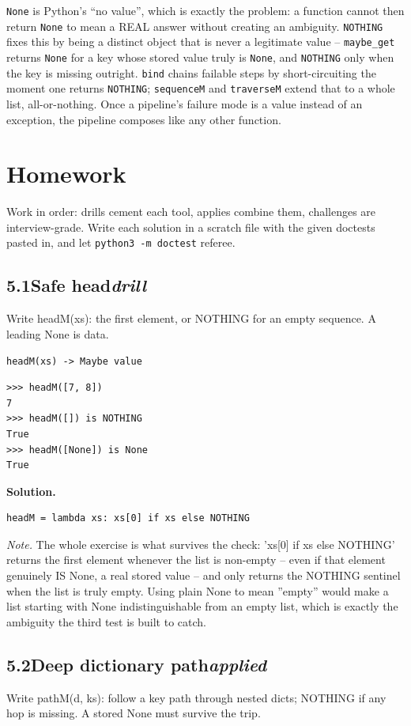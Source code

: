 \documentclass[10pt,letterpaper]{book}
\begin{document}
\texttt{None} is Python's ``no value'', which is exactly the problem: a
function cannot then return \texttt{None} to mean a REAL answer without
creating an ambiguity. \texttt{NOTHING} fixes this by being a distinct
object that is never a legitimate value -- \texttt{maybe\_get} returns
\texttt{None} for a key whose stored value truly is \texttt{None}, and
\texttt{NOTHING} only when the key is missing outright. \texttt{bind}
chains failable steps by short-circuiting the moment one returns
\texttt{NOTHING}; \texttt{sequenceM} and \texttt{traverseM} extend that to
a whole list, all-or-nothing. Once a pipeline's failure mode is a value
instead of an exception, the pipeline composes like any other function.
\section{Homework}
Work in order: drills cement each tool, applies combine them,
challenges are interview-grade. Write each solution in a scratch file with
the given doctests pasted in, and let \texttt{python3 -m doctest} referee.
\subsection*{5.1\quad Safe head\hfill\textnormal{\textit{drill}}}
Write headM(xs): the first element, or NOTHING for an empty sequence. A leading None is data.

\noindent\texttt{headM(xs) -> Maybe value}
\begin{lstlisting}[style=ex]
>>> headM([7, 8])
7
>>> headM([]) is NOTHING
True
>>> headM([None]) is None
True
\end{lstlisting}
\noindent\textbf{Solution.}
\begin{lstlisting}[style=code]
headM = lambda xs: xs[0] if xs else NOTHING
\end{lstlisting}
\noindent\textit{Note.} The whole exercise is what survives the check: 'xs[0] if xs else NOTHING' returns the first element whenever the list is non-empty -- even if that element genuinely IS None, a real stored value -- and only returns the NOTHING sentinel when the list is truly empty. Using plain None to mean ''empty'' would make a list starting with None indistinguishable from an empty list, which is exactly the ambiguity the third test is built to catch.

\subsection*{5.2\quad Deep dictionary path\hfill\textnormal{\textit{applied}}}
Write pathM(d, ks): follow a key path through nested dicts; NOTHING if any hop is missing. A stored None must survive the trip.
\end{document}
